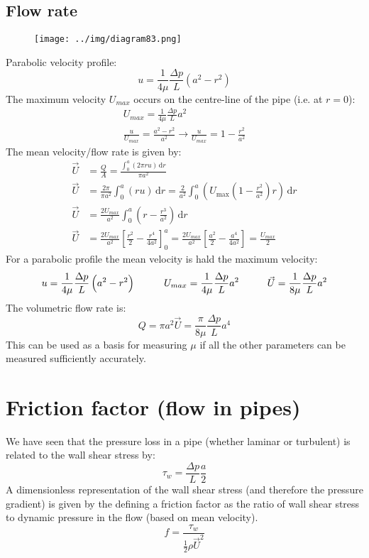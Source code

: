 \documentclass[class=report, crop=false, 12pt,a4paper]{standalone}
\begin{document}
\subsection{Flow rate}
\begin{figure}[H]
  \centering
  \texttt{[image: ../img/diagram83.png]}
  \caption{}
\end{figure}
Parabolic velocity profile:
\begin{equation}
  u = \frac{1}{4\mu} \frac{\Delta p}{L} \left( a^2 - r^2\right)
\end{equation}
The maximum velocity $U_{max}$ occurs on the centre-line of the pipe (i.e. at $r=0$):
\begin{gather}
  U_{max} = \frac{1}{4\mu} \frac{\Delta p}{L}a^2\\
  \frac{u}{U_{max}} = \frac{a^2 - r^2}{a^2} \rightarrow \frac{u}{U_{max}} = 1 - \frac{r^2}{a^2}
\end{gather}
The mean velocity/flow rate is given by:
\begin{align}
  \vec{U} &= \frac{Q}{A} = \frac{\int_{0}^{a} \left(2\pi r u \right) \,\textrm{d}r}{\pi a^2}\\
  \vec{U} &= \frac{2\pi}{\pi a^2} \int_{0}^{a} \left(r u \right) \,\textrm{d}r = \frac{2}{a^2} \int_{0}^{a} \left(U_{\max} \left(1 - \frac{r^2}{a^2}\right)r\right) \,\textrm{d}r \\
  \vec{U} &= \frac{2U_{max}}{a^2} \int_{0}^{a} \left(r-\frac{r^3}{a^2}\right) \,\textrm{d}r\\
  \vec{U} &= \frac{2U_{max}}{a^2} \left[ \frac{r^2}{2} - \frac{r^4}{4a^2} \right]_0^a = \frac{2U_{max}}{a^2} \left[ \frac{a^2}{2} - \frac{a^4}{4a^2} \right] = \frac{U_{max}}{2} 
\end{align}
For a parabolic profile the mean velocity is hald the maximum velocity:
\begin{equation}
  u = \frac{1}{4\mu} \frac{\Delta p}{L} \left(a^2 - r^2\right) \makebox[1cm]{} U_{max} = \frac{1}{4\mu} \frac{\Delta p }{L} a^2 \makebox[1cm]{} \vec{U} = \frac{1}{8\mu}\frac{\Delta p}{L} a^2
\end{equation}
The volumetric flow rate is: 
\begin{equation}
  Q = \pi a^2 \vec{U} = \frac{\pi}{8\mu}\frac{\Delta p}{L} a^4
\end{equation}
This can be used as a basis for measuring $\mu$ if all the other parameters can be measured sufficiently accurately.
\section{Friction factor (flow in pipes)}
We have seen that the pressure loss in a pipe (whether laminar or turbulent) is related to the wall shear stress by:
\begin{equation}
  \tau_w = \frac{\Delta p}{L}\frac{a}{2}
\end{equation}
A dimensionless representation of the wall shear stress (and therefore the pressure gradient) is given by the defining a friction factor as the ratio of wall shear stress to dynamic pressure in the flow (based on mean velocity).
\begin{equation}
  f = \frac{\tau_w}{\frac{1}{2}\rho \vec{U}^2}
\end{equation}
\end{document}
